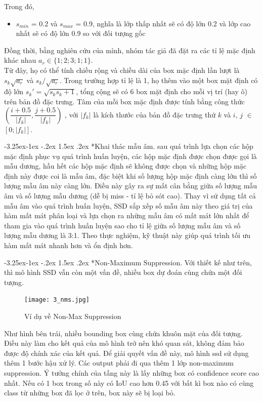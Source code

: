 \documentclass[a4paper]{report}
\makeatletter
\newcounter {subsubsubsection}[subsubsection]
\newcommand\subsubsubsection{\@startsection{subsubsubsection}{4}{\z@}%
                                     {-3.25ex\@plus -1ex \@minus -.2ex}%
                                     {1.5ex \@plus .2ex}%
                                     {\normalfont\normalsize\bfseries}}
\makeatother
\begin{document}
Trong đó, 
\begin{itemize}
	\item $s_{min}$ = 0.2 và $s_{max}$ = 0.9, nghĩa là lớp thấp nhất sẽ có độ lớn 0.2 và lớp cao nhất sẽ
	có độ lớn 0.9 so với đối tượng gốc
\end{itemize}

Đồng thời, bằng nghiên cứu của mình, nhóm tác giả đã đặt ra các tỉ lệ mặc định khác
nhau $a_r \in \{1; 2; 3; 1 ; 1 \}$. \\

Từ đây, họ có thể  tính chiều rộng và chiều dài của box mặc định lần lượt là 
$s_k\sqrt{a_r}$ và $s_k / \sqrt{a_r}$. Trong trường hợp tỉ lệ là 1, họ thêm vào một box mặt định có
độ lớn $s_k' = \sqrt{s_k s_k + 1}$,  tổng cộng sẽ có 6 box mặt định cho mỗi vị trí (hay ô) trên bản đồ
đặc trưng. Tâm của mỗi box mặc định được tính bằng công thức 
$ \left ( \dfrac{i+0.5}{|f_k|}, \dfrac{j+0.5}{|f_k|} \right )$ , với $|f_k|$ là
kích thước của bản đồ đặc trưng thứ $k$ và $i$, $j$ $\in$ $[0; |f_k| ]$.

\subsubsubsection*{Khai thác mẫu âm.}
sau quá trình lựa chọn các hộp mặc định phục vụ quá trình huấn luyện, các hộp mặc định được chọn được gọi là mẫu dương, hầu hết các hộp mặc định sẽ không được chọn và những hộp mặc định này được coi là mẫu âm, đặc biệt khi số lượng hộp mặc định càng lớn thì số lượng mẫu âm này càng lớn. Điều này gây ra sự mất cân bằng giữa số lượng mẫu âm và số lượng mẫu dương (dễ bị miss - tỉ lệ bỏ sót cao). Thay vì sử dụng tất cả mẫu âm vào quá trình huấn luyện, SSD sắp xếp số mẫu âm này theo giá trị của hàm mất mát phân loại và lựa chọn ra những mẫu âm có mất mát lớn nhất để tham gia vào quá trình huấn luyện sao cho tỉ lệ giữa số lượng mẫu âm và số lượng mẫu dương là 3:1. Theo thực nghiệm, kỹ thuật này giúp quá trình tối ưu hàm mất mát nhanh hơn và ổn định hơn. 

\subsubsubsection*{Non-Maximum Suppression.}
Với thiết kế như trên, thì mô hình SSD vẫn còn một vấn đề, nhiều box dự đoán cùng chứa một đối tượng. 

\begin{figure}
	\texttt{[image: 3\_nms.jpg]}
	\caption[Caption for LOF]{Ví dụ về Non-Max Suppression \footnotemark[0]} 
\end{figure}

Như hình bên trái, nhiều bounding box cùng chứa khuôn mặt của đối tượng. Điều này làm cho kết quả của mô hình trở nên khó quan sát, không đảm bảo được độ chính xác của kết quả. Để giải quyết vấn đề này, mô hình ssd sử dụng thêm 1 bước hậu xử lý. Các output phải đi qua thêm 1 lớp non-maximum suppression. Ý tưởng chính của tầng này là lấy những box có confidence score cao nhất. Nếu có 1 box trong số này có IoU cao hơn 0.45 với bất kì box nào có cùng class từ những box đã lọc ở trên, box này sẽ bị loại bỏ.  \\
\end{document}
